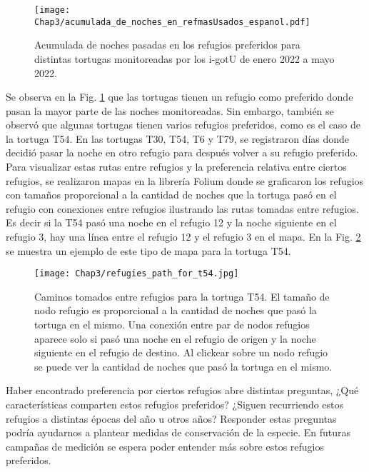 \begin{figure}[ht]
    \begin{center}
        \texttt{[image: Chap3/acumulada\_de\_noches\_en\_refmasUsados\_espanol.pdf]}
        \caption[Acumulada de noches pasadas en los refugios preferidos.]{Acumulada de noches pasadas en los refugios preferidos para distintas tortugas monitoreadas por los i-gotU de enero 2022 a mayo 2022.}
        \label{fig:refugios_preferidos}
       
        \end{center}
\end{figure}
Se observa en la Fig. \ref{fig:refugios_preferidos} que las tortugas tienen un refugio como preferido donde pasan la mayor parte de las noches monitoreadas. Sin embargo, también se observó que algunas tortugas tienen varios refugios preferidos, como es el caso de la tortuga T54. En las tortugas T30, T54, T6 y T79, se registraron días donde decidió pasar la noche en otro refugio para después volver a su refugio preferido. Para visualizar estas rutas entre refugios y la preferencia relativa entre ciertos refugios, se realizaron mapas en la librería Folium donde se graficaron los refugios con tamaños proporcional a la cantidad de noches que la tortuga pasó en el refugio con conexiones entre refugios ilustrando las rutas tomadas entre refugios. Es decir si la T54 pasó una noche en el refugio 12 y la noche siguiente en el refugio 3, hay una línea entre el refugio 12 y el refugio 3 en el mapa. En la Fig. \ref{fig:ruta_refus_T54} se muestra un ejemplo de este tipo de mapa para la tortuga T54.
 
\begin{figure}[ht]
    \begin{center}
        \texttt{[image: Chap3/refugies\_path\_for\_t54.jpg]}
        \caption[Caminos tomados entre refugios para la tortuga T54.]{Caminos tomados entre refugios para la tortuga T54. El tamaño de nodo refugio es proporcional a la cantidad de noches que pasó la tortuga en el mismo. Una conexión entre par de nodos refugios aparece solo si pasó una noche en el refugio de origen y la noche siguiente en el refugio de destino. Al clickear sobre un nodo refugio se puede ver la cantidad de noches que pasó la tortuga en el mismo.}
        \label{fig:ruta_refus_T54}
       
        \end{center}
\end{figure}
Haber encontrado preferencia por ciertos refugios abre distintas preguntas, ¿Qué características comparten estos refugios preferidos? ¿Siguen recurriendo estos refugios a distintas épocas del año u otros años?  Responder estas preguntas podría ayudarnos a plantear medidas de conservación de la especie. En futuras campañas de medición se espera poder entender más sobre estos refugios preferidos.
 
